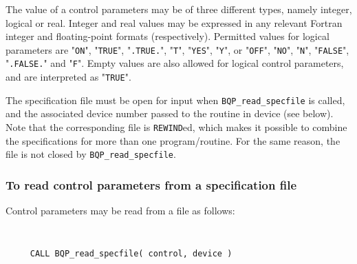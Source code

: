 \documentclass{galahad}
\newcommand{\packagename}{BQP}
\begin{document}
The value of a control parameters may be of three different types, namely
integer, logical or real.
Integer and real values may be expressed in any relevant Fortran integer and
floating-point formats (respectively). Permitted values for logical
parameters are "{\tt ON}", "{\tt TRUE}", "{\tt .TRUE.}", "{\tt T}", 
"{\tt YES}", "{\tt Y}", or "{\tt OFF}", "{\tt NO}",
"{\tt N}", "{\tt FALSE}", "{\tt .FALSE.}" and "{\tt F}". 
Empty values are also allowed for 
logical control parameters, and are interpreted as "{\tt TRUE}".  

The specification file must be open for 
input when {\tt \packagename\_read\_specfile}
is called, and the associated device number 
passed to the routine in device (see below). 
Note that the corresponding 
file is {\tt REWIND}ed, which makes it possible to combine the specifications 
for more than one program/routine.  For the same reason, the file is not
closed by {\tt \packagename\_read\_specfile}.

\subsubsection{To read control parameters from a specification file}
\label{readspec}

Control parameters may be read from a file as follows:
\hskip0.5in 

\def\baselinestretch{0.8}
{\tt 
\begin{verbatim}
     CALL BQP_read_specfile( control, device )
\end{verbatim}
}
\def\baselinestretch{1.0}
\end{document}
